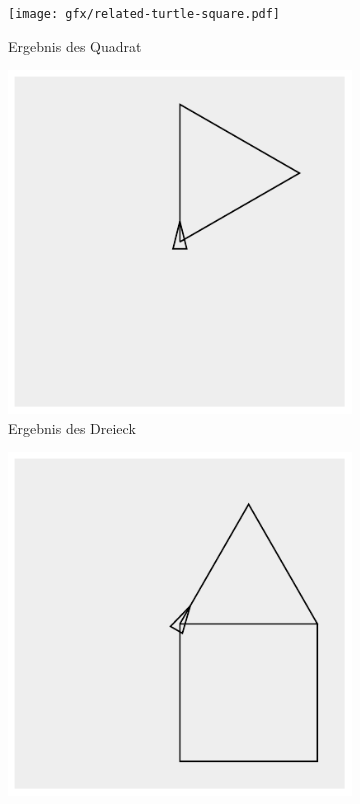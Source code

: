 \begin{figure}
    \begin{subfigure}[b]{0.3\textwidth}
        \texttt{[image: gfx/related-turtle-square.pdf]}
        \caption{Ergebnis des Quadrat}
        \label{fig:related:turtle:square:result}
    \end{subfigure}\hfill
    \begin{subfigure}[b]{0.3\textwidth}
        \includegraphics[width=\textwidth]{gfx/related-turtle-triangle.pdf}
        \caption{Ergebnis des Dreieck}
        \label{fig:related:turtle:triangle:result}
    \end{subfigure}\hfill
    \begin{subfigure}[b]{0.3\textwidth}
        \includegraphics[width=\textwidth]{gfx/related-turtle-house.pdf}

\end{subfigure}
\end{figure}
